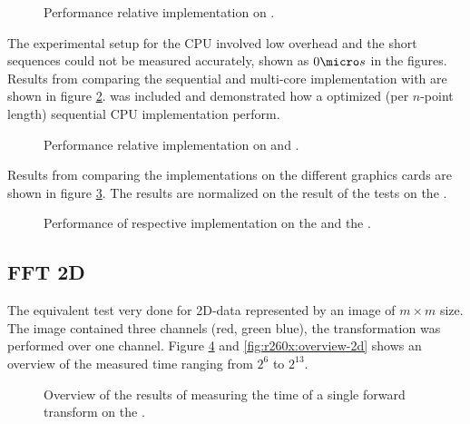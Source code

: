 \begin{figure}[\AllPlacementOptions]
	\centering
	
	\caption{Performance relative {\OCL} implementation on {\AMDCARD}.}
	\label{fig:r260x:implementation}
\end{figure}

The experimental setup for the CPU involved low overhead and the short sequences could not be measured accurately, shown as $0{\micro}s$ in the figures. Results from comparing the sequential {\CPP} and multi-core {\OMP} implementation with {\CU} are shown in figure \ref{fig:gtx:cpu}. {\FFTW} was included and demonstrated how a optimized (per $n$-point length) sequential CPU implementation perform.

\begin{figure}[\AllPlacementOptions]
	\centering
	
	\caption{Performance relative {\CU} implementation on {\NVCARD} and {\INTELCPU}.}
	\label{fig:gtx:cpu}
\end{figure}

Results from comparing the implementations on the different graphics cards are shown in figure \ref{fig:gpu-comparison}. The results are normalized on the result of the tests on the {\NVCARD}.

\begin{figure}[\AllPlacementOptions]
	\centering
	
	\caption{Performance of respective implementation on the {\AMDCARD} and the {\NVCARD}.}
	\label{fig:gpu-comparison}
\end{figure}


\newpage

\subsection{FFT 2D}

The equivalent test very done for 2D-data represented by an image of $m{\times}m$ size. The image contained three channels (red, green blue), the transformation was performed over one channel. Figure \ref{fig:gtx:overview-2d} and \ref{fig:r260x:overview-2d} shows an overview of the measured time ranging from $2^{6}$ to $2^{13}$.

\begin{figure}[\AllPlacementOptions]
	\centering
	
	\caption{Overview of the results of measuring the time of a single forward transform on the \NVCARD.}
	\label{fig:gtx:overview-2d}
\end{figure}

